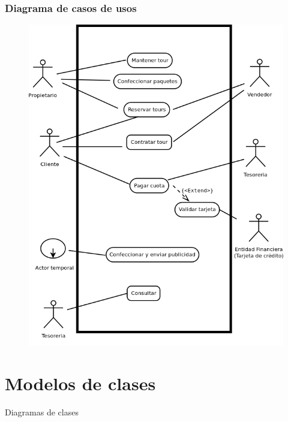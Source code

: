 \documentclass[12pt,a4paper,titlepage,oneside]{article}
\begin{document}
\subsubsection{Diagrama de casos de usos}
 
\begin{figure}[htb]
\centerline{\includegraphics[width=1.0\textwidth]{diagramaCasosDeUso}}
\label{fig:celda}
\end{figure}
 
 
 
\section{Modelos de clases}

Diagramas de clases  
 
 
\end{document}
